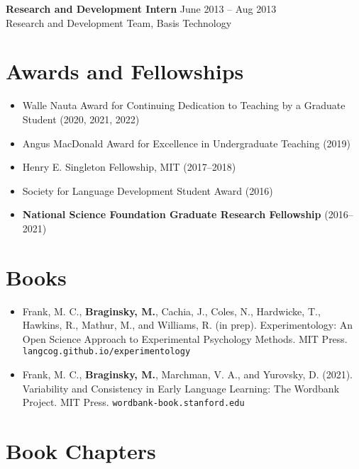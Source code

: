 \documentclass[11pt,]{article}
\providecommand{\tightlist}{%
  \setlength{\itemsep}{0pt}\setlength{\parskip}{0pt}}
\begin{document}
\textbf{Research and Development Intern} \hfill June 2013 -- Aug 2013\\
\hspace*{0.333em}\hspace*{0.333em}\hspace*{0.333em}Research and
Development Team, Basis Technology

\hypertarget{awards-and-fellowships}{%
\section{Awards and Fellowships}\label{awards-and-fellowships}}

\begin{itemize}
\tightlist
\item
  Walle Nauta Award for Continuing Dedication to Teaching by a Graduate
  Student (2020, 2021, 2022)
\item
  Angus MacDonald Award for Excellence in Undergraduate Teaching (2019)
\item
  Henry E. Singleton Fellowship, MIT (2017--2018)
\item
  Society for Language Development Student Award (2016)
\item
  \textbf{National Science Foundation Graduate Research Fellowship}
  (2016--2021)
\end{itemize}

\hypertarget{books}{%
\section{Books}\label{books}}

\begin{itemize}
\item
  Frank, M. C., \textbf{Braginsky, M.}, Cachia, J., Coles, N.,
  Hardwicke, T., Hawkins, R., Mathur, M., and Williams, R. (in prep).
  Experimentology: An Open Science Approach to Experimental Psychology
  Methods. MIT Press. \texttt{langcog.github.io/experimentology}
\item
  Frank, M. C., \textbf{Braginsky, M.}, Marchman, V. A., and Yurovsky,
  D. (2021). Variability and Consistency in Early Language Learning: The
  Wordbank Project. MIT Press. \texttt{wordbank-book.stanford.edu}
\end{itemize}

\hypertarget{book-chapters}{%
\section{Book Chapters}\label{book-chapters}}
\end{document}
